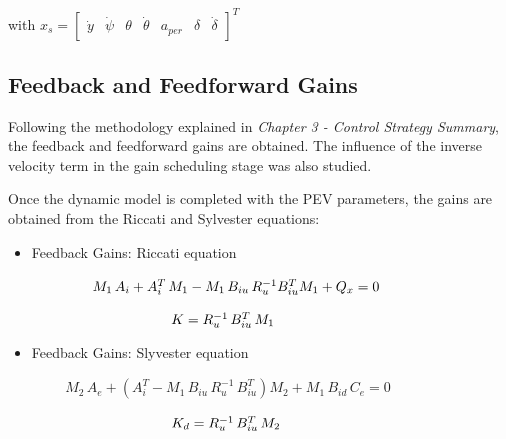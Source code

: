 \hspace{0.5cm}with $x_{s}=\begin{bmatrix}\dot{y} & \dot{\psi} & \theta & \dot{\theta}	& a_{per} & \delta & \dot{\delta} \end{bmatrix}^{T}$

\newpage
\subsection{Feedback and Feedforward Gains}

Following the methodology explained in \textit{Chapter 3 - Control Strategy Summary}, the feedback and feedforward gains are obtained. The influence of the inverse velocity term in the gain scheduling stage was also studied.

Once the dynamic model is completed with the PEV parameters, the gains are obtained from the Riccati and Sylvester equations:

\begin{itemize}
\begin{itemize}
\item Feedback Gains: Riccati equation 

$\hspace{1.5cm} M_{1}\,A_{i} + A_{i}^{T}\,M_{1} - M_{1}\,B_{iu}\,R_{u}^{-1}B_{iu}^{T}M_{1} + Q_{x}=0$

$\hspace{3.5cm} K=R_{u}^{-1}\,B_{iu}^{T}\,M_{1}$

\item Feedback Gains: Slyvester equation 

$\hspace{1cm}M_{2}\,A_{e}+(A_{i}^{T}-M_{1}\,B_{iu}\,R_{u}^{-1}\,B_{iu}^{T})M_{2}+M_{1}\,B_{id}\,C_{e}=0$

$\hspace{3.5cm} K_{d}=R_{u}^{-1}\,B_{iu}^{T}\,M_{2}$

\end{itemize}
\end{itemize}


